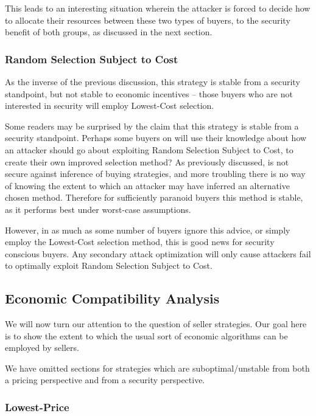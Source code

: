 This leads to an interesting situation wherein the attacker is forced
to decide how to allocate their resources between these two types of
buyers, to the security benefit of both groups, as discussed in the
next section.

\subsubsection*{Random Selection Subject to Cost}

As the inverse of the previous discussion, this strategy is stable
from a security standpoint, but not stable to economic incentives --
those buyers who are not interested in security will employ
Lowest-Cost selection.

Some readers may be surprised by the claim that this strategy is
stable from a security standpoint. Perhaps some buyers on \tOM{} will
use their knowledge about how an attacker should go about exploiting
Random Selection Subject to Cost, to create their own improved
selection method? As previously discussed, \tOM{} is not secure
against inference of buying strategies, and more troubling there is no
way of knowing the extent to which an attacker may have inferred an
alternative chosen method. Therefore for sufficiently paranoid buyers
this method is stable, as it performs best under worst-case
assumptions.

However, in as much as some number of \tOM{} buyers ignore this
advice, or simply employ the Lowest-Cost selection method, this is
good news for security conscious buyers. Any secondary attack
optimization will only cause attackers fail to optimally exploit
Random Selection Subject to Cost.

\subsection{Economic Compatibility Analysis}

We will now turn our attention to the question of seller
strategies. Our goal here is to show the extent to which the usual
sort of economic algorithms can be employed by sellers.

We have omitted sections for strategies which are suboptimal/unstable
from both a pricing perspective and from a security perspective.

\subsubsection*{Lowest-Price}

